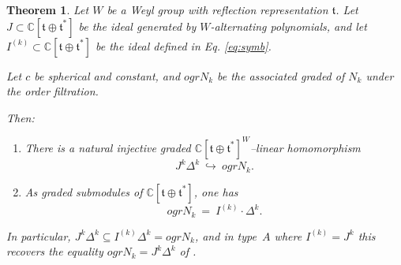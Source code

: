 \documentclass{amsart}
\numberwithin{equation}{section}
\newtheorem{theorem}[lemma]{Theorem}%
\theoremstyle{definition}
\newcommand{\ft}{\mathfrak{t}}
\newcommand{\C}{{\mathbb C}}
\begin{document}
\begin{theorem}\label{thm:zalgebra}
   Let $W$ be a Weyl group with reflection representation $\ft$. 
    Let $J\subset \C[\ft\oplus \ft^*]$ be the ideal generated by $W$-alternating polynomials, and let $I^{(k)}\subset \C[\ft\oplus \ft^*]$ be the ideal defined in Eq. \eqref{eq:symb}. 

Let $c$ be spherical and constant, and $ogr N_k$ be the associated graded of $N_k$ under the order filtration.
    
    Then:
    \begin{enumerate}
    \item There is a natural injective graded $\C[\ft\oplus \ft^*]^W$–linear homomorphism
    $$ J^k\Delta^k\ \hookrightarrow\ ogr N_k.$$
    \item As graded submodules of $\C[\ft\oplus \ft^*]$, one has
    $$ogr N_k\ =\ I^{(k)}\cdot\Delta^k.$$
    \end{enumerate}
    In particular, $J^k\Delta^k\subseteq I^{(k)}\Delta^k=ogr N_k$, and in type~$A$ where $I^{(k)}=J^k$ this recovers the equality $ogr N_k=J^k\Delta^k$ of \cite[Proposition 6.5]{GS1}.
\end{theorem}
\end{document}
